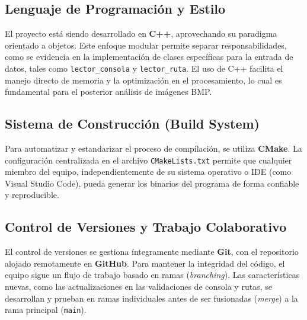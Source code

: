 \documentclass[11pt,a4paper]{article}
\begin{document}
\subsection{Lenguaje de Programación y Estilo}
El proyecto está siendo desarrollado en \textbf{C++}, aprovechando su paradigma orientado a objetos. Este enfoque modular permite separar responsabilidades, como se evidencia en la implementación de clases específicas para la entrada de datos, tales como \texttt{lector\_consola} y \texttt{lector\_ruta}. El uso de C++ facilita el manejo directo de memoria y la optimización en el procesamiento, lo cual es fundamental para el posterior análisis de imágenes BMP.

\subsection{Sistema de Construcción (Build System)}
Para automatizar y estandarizar el proceso de compilación, se utiliza \textbf{CMake}. La configuración centralizada en el archivo \texttt{CMakeLists.txt} permite que cualquier miembro del equipo, independientemente de su sistema operativo o IDE (como Visual Studio Code), pueda generar los binarios del programa de forma confiable y reproducible.

\subsection{Control de Versiones y Trabajo Colaborativo}
El control de versiones se gestiona íntegramente mediante \textbf{Git}, con el repositorio alojado remotamente en \textbf{GitHub}. Para mantener la integridad del código, el equipo sigue un flujo de trabajo basado en ramas (\textit{branching}). Las características nuevas, como las actualizaciones en las validaciones de consola y rutas, se desarrollan y prueban en ramas individuales antes de ser fusionadas (\textit{merge}) a la rama principal (\texttt{main}).
\end{document}
